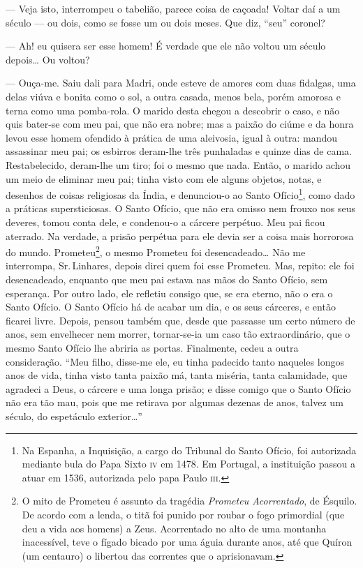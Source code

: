 --- Veja isto, interrompeu o tabelião, parece coisa de caçoada! Voltar
daí a um século --- ou dois, como se fosse um ou dois meses. Que diz,
``seu'' coronel?

--- Ah! eu quisera ser esse homem! É verdade que ele não voltou um
século depois\ldots{} Ou voltou?

--- Ouça-me. Saiu dali para Madri, onde esteve de amores com duas
fidalgas, uma delas viúva e bonita como o sol, a outra casada, menos
bela, porém amorosa e terna como uma pomba-rola. O marido desta chegou a
descobrir o caso, e não quis bater-se com meu pai, que não era nobre;
mas a paixão do ciúme e da honra levou esse homem ofendido à prática de
uma aleivosia, igual à outra: mandou assassinar meu pai; os esbirros
deram-lhe três punhaladas e quinze dias de cama. Restabelecido,
deram-lhe um tiro; foi o mesmo que nada. Então, o marido achou um meio
de eliminar meu pai; tinha visto com ele alguns objetos, notas, e
desenhos de coisas religiosas da Índia, e denunciou-o ao Santo
Ofício\footnote{Na Espanha, a Inquisição, a cargo do Tribunal do Santo
  Ofício, foi autorizada mediante bula do Papa Sixto \textsc{iv} em 1478. Em
  Portugal, a instituição passou a atuar em 1536, autorizada pelo papa
  Paulo \textsc{iii}.}, como dado a práticas supersticiosas. O Santo Ofício, que
não era omisso nem frouxo nos seus deveres, tomou conta dele, e
condenou-o a cárcere perpétuo. Meu pai ficou aterrado. Na verdade, a
prisão perpétua para ele devia ser a coisa mais horrorosa do mundo.
Prometeu\footnote{O mito de Prometeu é assunto da tragédia
  \emph{Prometeu Acorrentado}, de Ésquilo. De acordo com a lenda, o titã
  foi punido por roubar o fogo primordial (que deu a vida aos homens) a
  Zeus. Acorrentado no alto de uma montanha inacessível, teve o fígado
  bicado por uma águia durante anos, até que Quíron (um centauro) o
  libertou das correntes que o aprisionavam.}, o mesmo Prometeu foi
desencadeado\ldots{} Não me interrompa, Sr.\,Linhares, depois direi quem foi
esse Prometeu. Mas, repito: ele foi desencadeado, enquanto que meu pai
estava nas mãos do Santo Ofício, sem esperança. Por outro lado, ele
refletiu consigo que, se era eterno, não o era o Santo Ofício. O Santo
Ofício há de acabar um dia, e os seus cárceres, e então ficarei livre.
Depois, pensou também que, desde que passasse um certo número de anos,
sem envelhecer nem morrer, tornar-se-ia um caso tão extraordinário, que
o mesmo Santo Ofício lhe abriria as portas. Finalmente, cedeu a outra
consideração. ``Meu filho, disse-me ele, eu tinha padecido tanto
naqueles longos anos de vida, tinha visto tanta paixão má, tanta
miséria, tanta calamidade, que agradeci a Deus, o cárcere e uma longa
prisão; e disse comigo que o Santo Ofício não era tão mau, pois que me
retirava por algumas dezenas de anos, talvez um século, do espetáculo
exterior\ldots{}''

